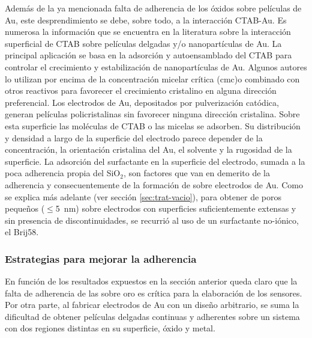			Además de la ya mencionada falta de adherencia de los óxidos sobre películas de Au, este desprendimiento se debe, sobre todo, a la interacción CTAB-Au. Es numerosa la información que se encuentra en la literatura sobre la interacción superficial de CTAB sobre películas delgadas y/o nanopartículas de Au. La principal aplicación se basa en la adsorción y autoensamblado del CTAB para controlar el crecimiento y estabilización de nanopartículas de Au. \cite{Cheng2003,Smith2008,Meena2013,Wang2013,Hamon2009} Algunos autores lo utilizan por encima de la concentración micelar crítica (cmc)\cite{Lim2014}o combinado con otros reactivos para favorecer el crecimiento cristalino en alguna dirección preferencial\cite{Smith2009}. Los electrodos de Au, depositados por pulverización catódica, generan películas policristalinas sin favorecer ninguna dirección cristalina.\cite{Svorcik2010,Bechelany2010} Sobre esta superficie las moléculas de CTAB o las micelas se adsorben. Su distribución y densidad a largo de la superficie del electrodo parece depender de la concentración, la orientación cristalina del Au, el solvente y la rugosidad de la superficie\cite{Meena2013,Lim2014}. La adsorción del surfactante en la superficie del electrodo, sumada a la poca adherencia propia del SiO$_2$, son factores que van en demerito de la adherencia y consecuentemente de la formación de \pdmC\space sobre electrodos de Au. %
			Como se explica más adelante (ver sección \ref{sec:trat-vacio}), para obtener \pdm\space de poros pequeños ($\leq$\SI{5}{\nm}) sobre electrodos con superficies suficientemente extensas y sin presencia de discontinuidades, se recurrió al uso de un surfactante no-iónico, el Brij58.
							
		\subsubsection{Estrategias para mejorar la adherencia}\label{sec:adherencia}

			 En función de los resultados expuestos en la sección anterior queda claro que la falta de adherencia de las \pdm\space sobre oro es crítica para la elaboración de los sensores. Por otra parte, al fabricar electrodos de Au con un diseño arbitrario, se suma la dificultad de obtener películas delgadas continuas y adherentes sobre un sistema con dos regiones distintas en su superficie, óxido y metal.
 
